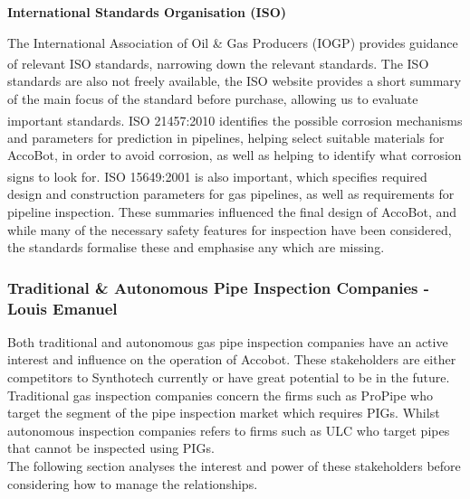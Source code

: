 \documentclass[11pt]{article}		%
\newcommand{\supercite}[1]{\textsuperscript{\cite{#1}}}		%
\begin{document}
			\textbf{International Standards Organisation (ISO)}
			
			The International Association of Oil \& Gas Producers (IOGP) provides guidance of relevant ISO standards\supercite{iogp2017standards}, narrowing down the relevant standards.
			The ISO standards are also not freely available, the ISO website provides a short summary of the main focus of the standard before purchase, allowing us to evaluate important standards.
			ISO 21457:2010\supercite{iso21457} identifies the possible corrosion mechanisms and parameters for prediction in pipelines, helping select suitable materials for AccoBot, in order to avoid corrosion, as well as helping to identify what corrosion signs to look for.
			ISO 15649:2001\supercite{iso15649} is also important, which specifies required design and construction parameters for gas pipelines, as well as requirements for pipeline inspection.
			These summaries influenced the final design of AccoBot, and while many of the necessary safety features for inspection have been considered, the standards formalise these and emphasise any which are missing.
		
		\subsubsection[Traditional \& Autonomous Pipe Inspection Companies]{Traditional \& Autonomous Pipe Inspection Companies - Louis Emanuel}
            Both traditional and autonomous gas pipe inspection companies have an active interest and influence on the operation of Accobot. These stakeholders are either competitors to Synthotech currently or have great potential to be in the future. Traditional gas inspection companies concern the firms such as ProPipe who target the segment of the pipe inspection market which requires PIGs. Whilst autonomous inspection companies refers to firms such as ULC who target pipes that cannot be inspected using PIGs. \\
            \hspace*{3ex}The following section analyses the interest and power of these stakeholders before considering how to manage the relationships.
            
\end{document}
